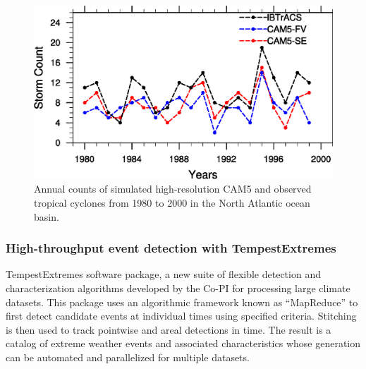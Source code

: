 \documentclass[11pt]{article}
\begin{document}
\begin{figure}[p]
\begin{center}
\includegraphics[width=5.5in]{NA_interannual.eps}
\end{center}
\caption{Annual counts of simulated high-resolution CAM5 and observed tropical cyclones from 1980 to 2000 in the North Atlantic ocean basin.} \label{fig:NATCs}
\end{figure}

\subsubsection{High-throughput event detection with TempestExtremes} \label{sec:TempestExtremes}

TempestExtremes software package, a new suite of flexible detection and characterization algorithms developed by the Co-PI for processing large climate datasets. This package uses an algorithmic framework known as ``MapReduce'' to first detect candidate events at individual times using specified criteria. Stitching is then used to track pointwise and areal detections in time. The result is a catalog of extreme weather events and associated characteristics whose generation can be automated and parallelized for multiple datasets.
\end{document}
